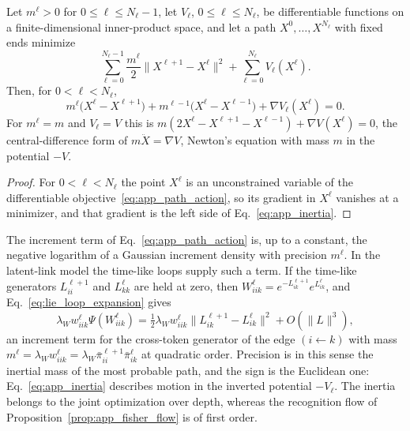\documentclass[twoside,11pt]{article}
\begin{document}
\begin{proposition}
\label{prop:app_inertia}
Let $m^\ell>0$ for $0\le\ell\le N_\ell-1$, let $V_\ell$, $0\le\ell\le N_\ell$, be differentiable functions on a finite-dimensional inner-product space, and let a path $X^0,\ldots,X^{N_\ell}$ with fixed ends minimize
\begin{equation}
\sum_{\ell=0}^{N_\ell-1}\frac{m^\ell}2\bigl\|X^{\ell+1}-X^\ell\bigr\|^2+\sum_{\ell=0}^{N_\ell}V_\ell(X^\ell).
\label{eq:app_path_action}
\end{equation}
Then, for $0<\ell<N_\ell$,
\begin{equation}
m^\ell\bigl(X^\ell-X^{\ell+1}\bigr)+m^{\ell-1}\bigl(X^\ell-X^{\ell-1}\bigr)+\nabla V_\ell(X^\ell)=0.
\label{eq:app_inertia}
\end{equation}
For $m^\ell=m$ and $V_\ell=V$ this is $m(2X^\ell-X^{\ell+1}-X^{\ell-1})+\nabla V(X^\ell)=0$, the central-difference form of $m\ddot X=\nabla V$, Newton's equation with mass $m$ in the potential $-V$.
\end{proposition}
\begin{proof}
For $0<\ell<N_\ell$ the point $X^\ell$ is an unconstrained variable of the differentiable objective~\eqref{eq:app_path_action}, so its gradient in $X^\ell$ vanishes at a minimizer, and that gradient is the left side of Eq.~\eqref{eq:app_inertia}.
\end{proof}

The increment term of Eq.~\eqref{eq:app_path_action} is, up to a constant, the negative logarithm of a Gaussian increment density with precision $m^\ell$. In the latent-link model the time-like loops supply such a term. If the time-like generators $L_{ii}^{\ell+1}$ and $L_{kk}^\ell$ are held at zero, then $W_{iik}^\ell=e^{-L_{ik}^{\ell+1}}e^{L_{ik}^\ell}$, and Eq.~\eqref{eq:lie_loop_expansion} gives
\begin{equation*}
\lambda_Ww_{iik}^\ell\Psi(W_{iik}^\ell)=\tfrac12\lambda_Ww_{iik}^\ell\bigl\|L_{ik}^{\ell+1}-L_{ik}^\ell\bigr\|^2+O(\|L\|^3),
\end{equation*}
an increment term for the cross-token generator of the edge $(i\leftarrow k)$ with mass $m^\ell=\lambda_Ww_{iik}^\ell=\lambda_W\bar\pi_{ii}^{\ell+1}\bar\pi_{ik}^\ell$ at quadratic order. Precision is in this sense the inertial mass of the most probable path, and the sign is the Euclidean one: Eq.~\eqref{eq:app_inertia} describes motion in the inverted potential $-V_\ell$. The inertia belongs to the joint optimization over depth, whereas the recognition flow of Proposition~\ref{prop:app_fisher_flow} is of first order.
\end{document}
